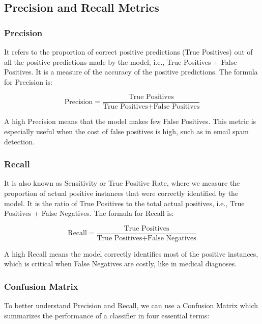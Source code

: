 \documentclass[12pt,a4paper]{article}
\begin{document}
\subsection{Precision and Recall Metrics}

\subsubsection{Precision}

It refers to the proportion of correct positive predictions (True Positives) out of all the positive predictions made by the model, i.e., True Positives + False Positives. It is a measure of the accuracy of the positive predictions. The formula for Precision is:

\begin{equation}
\text{Precision} = \frac{\text{True Positives}}{\text{True Positives} + \text{False Positives}}
\end{equation}

A high Precision means that the model makes few False Positives. This metric is especially useful when the cost of false positives is high, such as in email spam detection.

\subsubsection{Recall}

It is also known as Sensitivity or True Positive Rate, where we measure the proportion of actual positive instances that were correctly identified by the model. It is the ratio of True Positives to the total actual positives, i.e., True Positives + False Negatives. The formula for Recall is:

\begin{equation}
\text{Recall} = \frac{\text{True Positives}}{\text{True Positives} + \text{False Negatives}}
\end{equation}

A high Recall means the model correctly identifies most of the positive instances, which is critical when False Negatives are costly, like in medical diagnoses.

\subsubsection{Confusion Matrix}

To better understand Precision and Recall, we can use a Confusion Matrix which summarizes the performance of a classifier in four essential terms:
\end{document}
